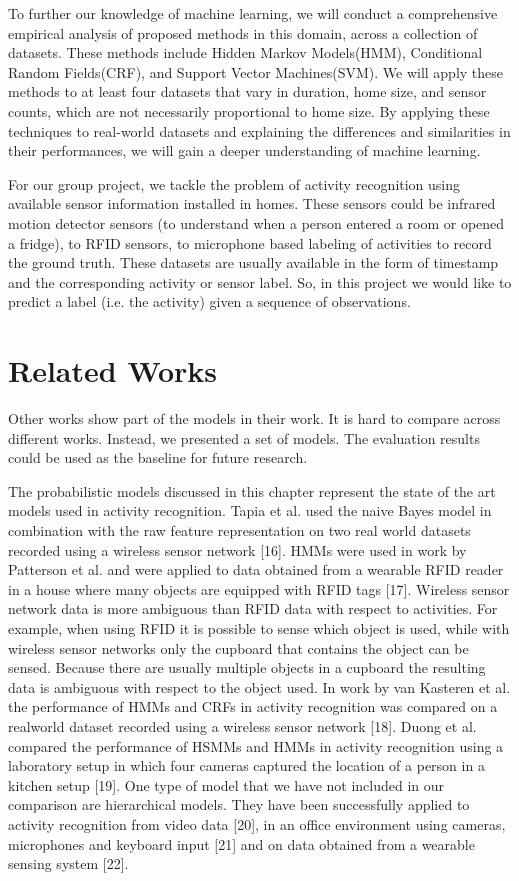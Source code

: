 \documentclass[11pt, oneside]{article}   	%
\begin{document}
To further our knowledge of machine learning, we will conduct a comprehensive empirical analysis of proposed methods in this domain, across a collection of datasets. These methods include Hidden Markov Models(HMM), Conditional Random Fields(CRF), and Support Vector Machines(SVM). We will apply these methods to at least four datasets that vary in duration, home size, and sensor counts, which are not necessarily proportional to home size. By applying these techniques to real-world datasets and explaining the differences and similarities in their performances, we will gain a deeper understanding of machine learning.

For our group project, we tackle the problem of activity recognition using available sensor information installed in homes. These sensors could be infrared motion detector sensors (to understand when a person entered a room or opened a fridge), to RFID sensors, to microphone based labeling of activities to record the ground truth. These datasets are usually available in the form of timestamp and the corresponding activity or sensor label. So, in this project we would like to predict a label (i.e. the activity) given a sequence of observations. 

\section{Related Works}
Other works show part of the models in their work. It is hard to compare across different works. Instead, we presented a set of models. The evaluation results could be used as the baseline for future research.



The probabilistic models discussed in this chapter represent the state of the art models used in activity recognition. Tapia et al. used the naive Bayes model in combination with the raw feature representation on two real world datasets recorded using a wireless sensor network [16]. HMMs were used in work by Patterson et al. and were applied to data obtained from a wearable RFID reader in a house where many objects are equipped with RFID tags [17]. Wireless sensor network data is more ambiguous than RFID data with respect to activities. For example, when using RFID it is possible to sense which object is used, while with wireless sensor networks only the cupboard that contains the object can be sensed. Because there are usually multiple objects in a cupboard the resulting data is ambiguous with respect to the object used. In work by van Kasteren et al. the performance of HMMs and CRFs in activity recognition was compared on a realworld dataset recorded using a wireless sensor network [18]. Duong et al. compared the performance of HSMMs and HMMs in activity recognition using a laboratory setup in which four cameras captured the location of a person in a kitchen setup [19]. One type of model that we have not included in our comparison are hierarchical models. They have been successfully applied to activity recognition from video data [20], in an office environment using cameras, microphones and keyboard input [21] and on data obtained from a wearable sensing system [22].
\end{document}
